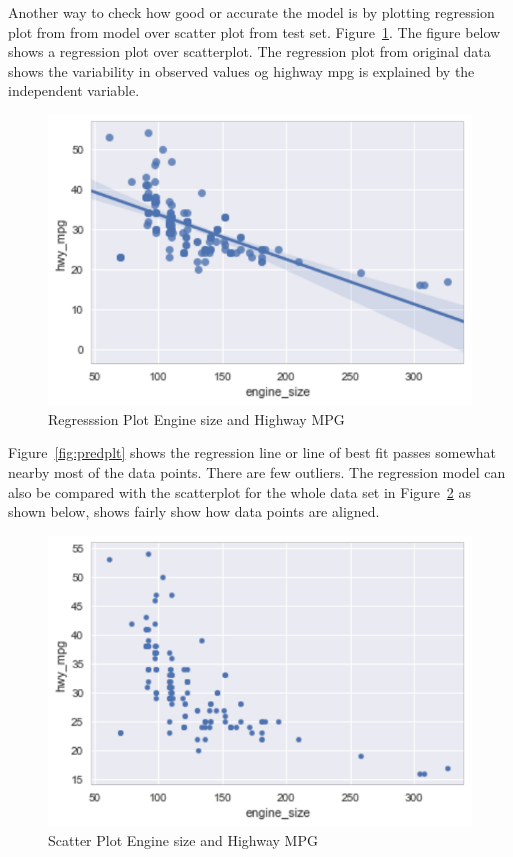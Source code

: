  
Another way to check how good or accurate the model is by plotting
regression plot from from model over scatter plot from test set.
Figure~\ref{fig:regplt}. The figure below shows a regression plot over
scatterplot. The regression plot from original data shows the
variability in observed values og highway mpg is explained by the
independent variable.
 
 \begin{figure}[!h]
  \includegraphics[scale=1.0]{images/reg_plot.pdf}
  \caption{Regresssion Plot Engine size and Highway MPG}
\label{fig:regplt}
\end{figure}
 
 
Figure~\ref{fig:predplt} shows the regression line or line of best
fit passes somewhat nearby most of the data points. There are few
outliers. The regression model can also be compared with the
scatterplot for the whole data set in Figure~\ref{fig:scatterplt} as
shown below, shows fairly show how data points are aligned.
 
  \begin{figure}[h!]
  \includegraphics[scale=1.0]{images/scatterplot.pdf}
  \caption{Scatter Plot Engine size and Highway MPG}
\label{fig:scatterplt}
\end{figure} 
 
